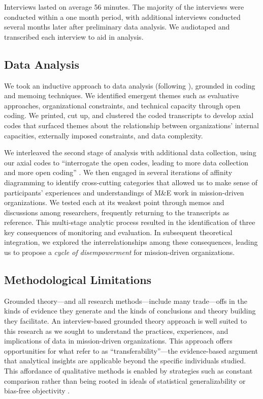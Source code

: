 Interviews lasted on average 56 minutes. The majority of the interviews were conducted within a one month period, with additional interviews conducted several months later after preliminary data analysis. We audiotaped and transcribed each interview to aid in analysis.

\subsection{Data Analysis}
We took an inductive approach to data analysis (following \cite{Corbin2014Basics}), grounded in coding and memoing techniques. We identified emergent themes such as evaluative approaches, organizational constraints, and technical capacity through open coding. We printed, cut up, and clustered the coded transcripts to develop axial codes that surfaced themes about the relationship between organizations’ internal capacities, externally imposed constraints, and data complexity.

We interleaved the second stage of analysis with additional data collection, using our axial codes to “interrogate the open codes, leading to more data collection and more open coding” \citep{Muller2014Grounded}. We then engaged in several iterations of affinity diagramming to identify cross-cutting categories that allowed us to make sense of participants’ experiences and understandings of M\&E work in mission-driven organizations. We tested each at its weakest point through memos and discussions among researchers, frequently returning to the transcripts as reference. This multi-stage analytic process resulted in the identification of three key consequences of monitoring and evaluation. In subsequent theoretical integration, we explored the interrelationships among these consequences, leading us to propose a \textit{cycle of disempowerment} for mission-driven organizations.

\subsection{Methodological Limitations}
Grounded theory---and all research methods—include many trade---offs in the kinds of evidence they generate and the kinds of conclusions and theory building they facilitate. An interview-based grounded theory approach is well suited to this research as we sought to understand the practices, experiences, and implications of data in mission-driven organizations. This approach offers opportunities for what \cite{Lincoln1985Naturalistic} refer to as “transferability”---the evidence-based argument that analytical insights are applicable beyond the specific individuals studied. This affordance of qualitative methods is enabled by strategies such as constant comparison rather than being rooted in ideals of statistical generalizability or bias-free objectivity \citep{Lincoln1985Naturalistic}.


